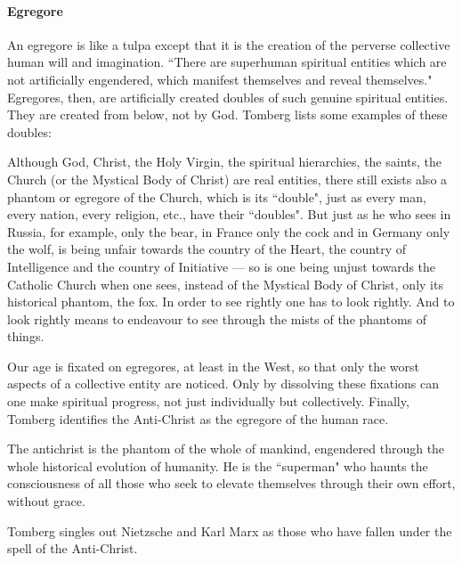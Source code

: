 \paragraph{Egregore}
An egregore is like a tulpa except that it is the creation of the perverse collective human will and imagination. ``There are superhuman spiritual entities which are not artificially engendered, which manifest themselves and reveal themselves." Egregores, then, are artificially created doubles of such genuine spiritual entities. They are created from below, not by God. Tomberg lists some examples of these doubles:

\begin{quotex}
Although God, Christ, the Holy Virgin, the spiritual hierarchies, the saints, the Church (or the Mystical Body of Christ) are real entities, there still exists also a phantom or egregore of the Church, which is its ``double", just as every man, every nation, every religion, etc., have their ``doubles". But just as he who sees in Russia, for example, only the bear, in France only the cock and in Germany only the wolf, is being unfair towards the country of the Heart, the country of Intelligence and the country of Initiative — so is one being unjust towards the Catholic Church when one sees, instead of the Mystical Body of Christ, only its historical phantom, the fox. In order to see rightly one has to look rightly. And to look rightly means to endeavour to see through the mists of the phantoms of things. 

\end{quotex}
Our age is fixated on egregores, at least in the West, so that only the worst aspects of a collective entity are noticed. Only by dissolving these fixations can one make spiritual progress, not just individually but collectively. Finally, Tomberg identifies the Anti-Christ as the egregore of the human race.

\begin{quotex}
The antichrist is the phantom of the whole of mankind, engendered through the whole historical evolution of humanity. He is the ``superman" who haunts the consciousness of all those who seek to elevate themselves through their own effort, without grace.

\end{quotex}
Tomberg singles out Nietzsche and Karl Marx as those who have fallen under the spell of the Anti-Christ.




